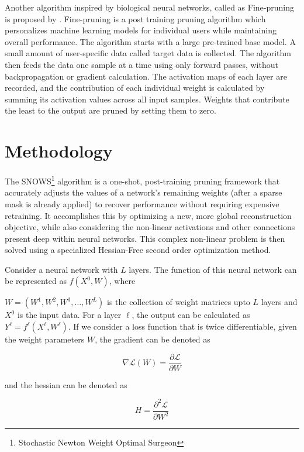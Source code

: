 \documentclass[11pt]{extreport}
\begin{document}
	Another algorithm inspired by biological neural networks, called as Fine-pruning is proposed by \citeauthor{BINGHAM2025101242}. Fine-pruning is a post training pruning algorithm which personalizes machine learning models for individual users while maintaining overall performance. The algorithm starts with a large pre-trained base model. A small amount of user-specific data called target data is collected. The algorithm then feeds the data one sample at a time using only forward passes, without backpropagation or gradient calculation. The activation maps of each layer are recorded, and the contribution of each individual weight is calculated by summing its activation values across all input samples. Weights that contribute the least to the output are pruned by setting them to zero.

	\newpage
	\chapter[Methodology]{Methodology}

		The SNOWS\footnote{Stochastic Newton Weight Optimal Surgeon} algorithm is a one-shot, post-training pruning framework that accurately adjusts the values of a network's remaining weights (after a sparse mask is already applied) to recover performance without requiring expensive retraining. It accomplishes this by optimizing a new, more global reconstruction objective, while also considering the non-linear activations and other connections present deep within neural networks. This complex non-linear problem is then solved using a specialized Hessian-Free second order optimization method.

		Consider a neural network with \(L\) layers. The function of this neural network can be represented as \(f(X^0, W)\), where 
		
		\noindent \(W = (W^1, W^2, W^3, \ldots, W^L)\) is the collection of weight matrices upto \(L\) layers and \(X^0\) is the input data. For a layer \(\ell\), the output can be calculated as \(Y^{\ell} = f^{\ell}(X^{\ell},W^{\ell})\). If we consider a loss function that is twice differentiable, given the weight parameters \(W\), the gradient can be denoted as 
		
		$$\nabla \mathcal{L}(W) = \frac{\partial \mathcal{L}}{\partial W} $$
		
		and the hessian can be denoted as 

		$$H = \frac{\partial^2 \mathcal{L}}{\partial W^2}$$
\end{document}
